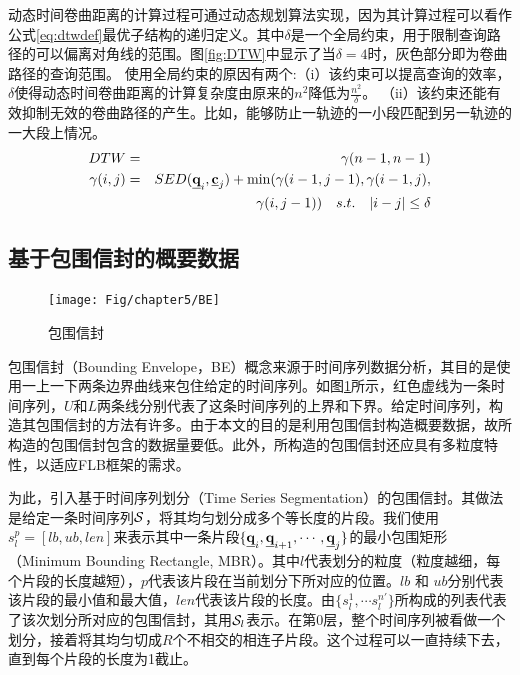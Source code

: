 动态时间卷曲距离的计算过程可通过动态规划算法实现，因为其计算过程可以看作公式\ref{eq:dtwdef}最优子结构的递归定义。其中$\delta$是一个全局约束，用于限制查询路径的可以偏离对角线的范围。图\ref{fig:DTW}中显示了当$\delta=4$时，灰色部分即为卷曲路径的查询范围。
使用全局约束的原因有两个:（i）该约束可以提高查询的效率，$\delta$使得动态时间卷曲距离的计算复杂度由原来的$n^2$降低为$\frac{n^2}{\delta}$。
（ii）该约束还能有效抑制无效的卷曲路径的产生。比如，能够防止一轨迹的一小段匹配到另一轨迹的一大段上情况。
\begin{eqnarray}\label{eq:dtwdef}
DTW&=&\gamma(n-1,n-1) \\ \nonumber
\gamma(i,j)&=&SED(\emph{{\textbf{q}}}_{i}, \emph{{\textbf{c}}}_{j}) + \min(\gamma(i-1,j-1), \gamma(i-1,j), \nonumber \\
&&\gamma(i,j-1))  \quad s.t.  \quad |i-j| \le \delta
\end{eqnarray}



\subsection{基于包围信封的概要数据}\label{sec-c5-BE}
\begin{figure}[t]
	\centering
	\texttt{[image: Fig/chapter5/BE]}
	\caption{包围信封}
	\label{fig:BE}
\end{figure}
包围信封（Bounding Envelope，BE）概念来源于时间序列数据分析，其目的是使用一上一下两条边界曲线来包住给定的时间序列。如图\ref{fig:BE}所示，红色虚线为一条时间序列，$U$和$L$两条线分别代表了这条时间序列的上界和下界。给定时间序列，构造其包围信封的方法有许多。由于本文的目的是利用包围信封构造概要数据，故所构造的包围信封包含的数据量要低。此外，所构造的包围信封还应具有多粒度特性，以适应FLB框架的需求。

为此，引入基于时间序列划分（Time Series Segmentation）的包围信封。其做法是给定一条时间序列$\cal S$，将其均匀划分成多个等长度的片段。我们使用$s_{l}^{p}= {[lb, ub, len]}$来表示其中一条片段$\{\emph{{\textbf{q}}}_{i}, \emph{{\textbf{q}}}_{i+1}, \cdots, \emph{{\textbf{q}}}_{j} \}$的最小包围矩形（Minimum Bounding Rectangle, MBR）。其中$l$代表划分的粒度（粒度越细，每个片段的长度越短），$p$代表该片段在当前划分下所对应的位置。$lb$ 和 $ub$分别代表该片段的最小值和最大值，$len$代表该片段的长度。由$\{s_{l}^{1}, \cdots s_{l}^{n'}\}$所构成的列表代表了该次划分所对应的包围信封，其用${\cal S}_{l}$表示。在第0层，整个时间序列被看做一个划分，接着将其均匀切成$R$个不相交的相连子片段。这个过程可以一直持续下去，直到每个片段的长度为1截止。

